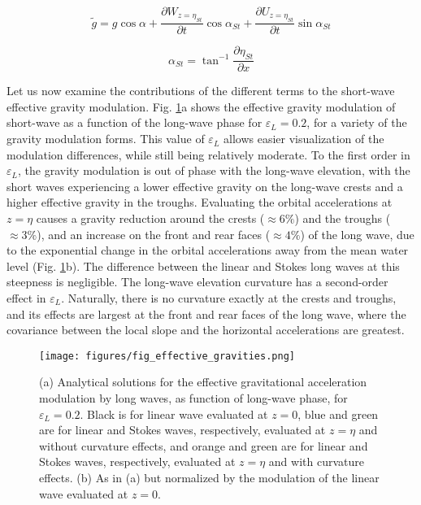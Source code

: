 \documentclass[lineno]{jfm}
\begin{document}
\begin{equation}
\label{eq:gravity_modulation_general_stokes}
\widetilde{g}
  = g \cos{\alpha} 
  + \dfrac{\partial W_{z=\eta_{St}}}{\partial t} \cos{\alpha_{St}}
  + \dfrac{\partial U_{z=\eta_{St}}}{\partial t} \sin{\alpha_{St}}
\end{equation}

\begin{equation}
\label{eq:local_slope_stokes}
\alpha_{St} = \tan^{-1}{\dfrac{\partial \eta_{St}}{\partial x}}
\end{equation}

Let us now examine the contributions of the different terms to the short-wave
effective gravity modulation.
Fig. \ref{fig:effective_gravities}a shows the effective gravity modulation of
short-wave as a function of the long-wave phase for $\varepsilon_L = 0.2$, for
a variety of the gravity modulation forms.
This value of $\varepsilon_L$ allows easier visualization of the modulation
differences, while still being relatively moderate.
To the first order in $\varepsilon_L$, the gravity modulation is out of phase
with the long-wave elevation, with the short waves experiencing a lower effective
gravity on the long-wave crests and a higher effective gravity in the troughs.
Evaluating the orbital accelerations at $z=\eta$ causes a gravity reduction
around the crests ($\approx6\%$) and the troughs ($\approx 3\%$), and an
increase on the front and rear faces ($\approx 4\%$) of the long wave, due to
the exponential change in the orbital accelerations away from the mean water level
(Fig. \ref{fig:effective_gravities}b).
The difference between the linear and Stokes long waves at this steepness is
negligible.
The long-wave elevation curvature has a second-order effect in $\varepsilon_L$.
Naturally, there is no curvature exactly at the crests and troughs, and its
effects are largest at the front and rear faces of the long wave, where the
covariance between the local slope and the horizontal accelerations are greatest.

\begin{figure}
\centering
\texttt{[image: figures/fig\_effective\_gravities.png]}
\caption{
  (a) Analytical solutions for the effective gravitational acceleration
  modulation by long waves, as function of long-wave phase, for $\varepsilon_L = 0.2$.
  Black is for linear wave evaluated at $z=0$,
  blue and green are for linear and Stokes waves, respectively, evaluated at $z=\eta$ and without curvature effects,
  and orange and green are for linear and Stokes waves, respectively, evaluated at $z=\eta$ and with curvature effects.
  (b) As in (a) but normalized by the modulation of the linear wave evaluated at $z=0$.
}
\label{fig:effective_gravities}
\end{figure}
\end{document}
